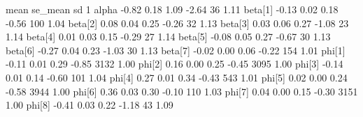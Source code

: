\documentclass[]{tufte-handout}
\newenvironment{Shaded}{}{}
\newcommand{\DecValTok}[1]{\textcolor[rgb]{0.25,0.63,0.44}{#1}}
\newcommand{\FloatTok}[1]{\textcolor[rgb]{0.25,0.63,0.44}{#1}}
\newcommand{\NormalTok}[1]{#1}
\begin{document}
\begin{Shaded}
\begin{Highlighting}[]
\NormalTok{            mean se_mean    sd       }\DecValTok{1}\NormalTok{%
\NormalTok{alpha      }\FloatTok{-0.82}    \FloatTok{0.18}  \FloatTok{1.09}    \FloatTok{-2.64}    \DecValTok{36} \FloatTok{1.11}
\NormalTok{beta[}\DecValTok{1}\NormalTok{]    }\FloatTok{-0.13}    \FloatTok{0.02}  \FloatTok{0.18}    \FloatTok{-0.56}   \DecValTok{100} \FloatTok{1.04}
\NormalTok{beta[}\DecValTok{2}\NormalTok{]     }\FloatTok{0.08}    \FloatTok{0.04}  \FloatTok{0.25}    \FloatTok{-0.26}    \DecValTok{32} \FloatTok{1.13}
\NormalTok{beta[}\DecValTok{3}\NormalTok{]     }\FloatTok{0.03}    \FloatTok{0.06}  \FloatTok{0.27}    \FloatTok{-1.08}    \DecValTok{23} \FloatTok{1.14}
\NormalTok{beta[}\DecValTok{4}\NormalTok{]     }\FloatTok{0.01}    \FloatTok{0.03}  \FloatTok{0.15}    \FloatTok{-0.29}    \DecValTok{27} \FloatTok{1.14}
\NormalTok{beta[}\DecValTok{5}\NormalTok{]    }\FloatTok{-0.08}    \FloatTok{0.05}  \FloatTok{0.27}    \FloatTok{-0.67}    \DecValTok{30} \FloatTok{1.13}
\NormalTok{beta[}\DecValTok{6}\NormalTok{]    }\FloatTok{-0.27}    \FloatTok{0.04}  \FloatTok{0.23}    \FloatTok{-1.03}    \DecValTok{30} \FloatTok{1.13}
\NormalTok{beta[}\DecValTok{7}\NormalTok{]    }\FloatTok{-0.02}    \FloatTok{0.00}  \FloatTok{0.06}    \FloatTok{-0.22}   \DecValTok{154} \FloatTok{1.01}
\NormalTok{phi[}\DecValTok{1}\NormalTok{]     }\FloatTok{-0.11}    \FloatTok{0.01}  \FloatTok{0.29}    \FloatTok{-0.85}  \DecValTok{3132} \FloatTok{1.00}
\NormalTok{phi[}\DecValTok{2}\NormalTok{]      }\FloatTok{0.16}    \FloatTok{0.00}  \FloatTok{0.25}    \FloatTok{-0.45}  \DecValTok{3095} \FloatTok{1.00}
\NormalTok{phi[}\DecValTok{3}\NormalTok{]     }\FloatTok{-0.14}    \FloatTok{0.01}  \FloatTok{0.14}    \FloatTok{-0.60}   \DecValTok{101} \FloatTok{1.04}
\NormalTok{phi[}\DecValTok{4}\NormalTok{]      }\FloatTok{0.27}    \FloatTok{0.01}  \FloatTok{0.34}    \FloatTok{-0.43}   \DecValTok{543} \FloatTok{1.01}
\NormalTok{phi[}\DecValTok{5}\NormalTok{]      }\FloatTok{0.02}    \FloatTok{0.00}  \FloatTok{0.24}    \FloatTok{-0.58}  \DecValTok{3944} \FloatTok{1.00}
\NormalTok{phi[}\DecValTok{6}\NormalTok{]      }\FloatTok{0.36}    \FloatTok{0.03}  \FloatTok{0.30}    \FloatTok{-0.10}   \DecValTok{110} \FloatTok{1.03}
\NormalTok{phi[}\DecValTok{7}\NormalTok{]      }\FloatTok{0.04}    \FloatTok{0.00}  \FloatTok{0.15}    \FloatTok{-0.30}  \DecValTok{3151} \FloatTok{1.00}
\NormalTok{phi[}\DecValTok{8}\NormalTok{]     }\FloatTok{-0.41}    \FloatTok{0.03}  \FloatTok{0.22}    \FloatTok{-1.18}    \DecValTok{43} \FloatTok{1.09}
}
\end{Highlighting}
\end{Shaded}
\end{document}
